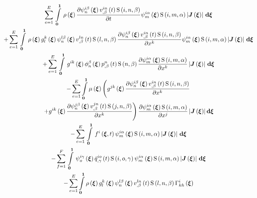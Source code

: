 \begin{multline}
  \gsum{e=1}{E}{\gint{\vectr{0}}{\vectr{1}}{\fnof{\rho}{\vectr{\xi}}\delby{\idxgbfn{i}{n}{\beta}{\vectr{\xi}}
  \fnof{\idxnodedof{v}{i}{n}{\beta}}{t}\idxgsf{i}{n}{\beta}}{t}\idxgbfn{i}{m}{\alpha}{\vectr{\xi}}\idxgsf{i}{m}{\alpha}\abs{\fnof{\matr{J}}{\vectr{\xi}}}}{\vectr{\xi}}}\\
  +\gsum{e=1}{E}{\gint{\vectr{0}}{\vectr{1}}{\fnof{\rho}{\vectr{\xi}}\fnof{g^{k}_{l}}{\vectr{\xi}}\idxgbfn{l}{n}{\beta}{\vectr{\xi}}
  \fnof{\idxnodedof{v}{l}{n}{\beta}}{t}\idxgsf{l}{n}{\beta}\delby{\idxgbfn{i}{n}{\beta}{\vectr{\xi}}
  \fnof{\idxnodedof{v}{i}{n}{\beta}}{t}\idxgsf{i}{n}{\beta}}{x^{k}}\idxgbfn{i}{m}{\alpha}{\vectr{\xi}}\idxgsf{i}{m}{\alpha}\abs{\fnof{\matr{J}}{\vectr{\xi}}}}{\vectr{\xi}}}\\
  +\gsum{e=1}{E}{\gint{\vectr{0}}{\vectr{1}}{\fnof{g^{ik}}{\vectr{\xi}}\altgbfn{n}{\beta}{\vectr{\xi}}
  \fnof{\nodedof{p}{n}{\beta}}{t}\gsf{n}{\beta}\delby{\idxgbfn{i}{m}{\alpha}{\vectr{\xi}}\idxgsf{i}{m}{\alpha}}{x^{k}}\abs{\fnof{\matr{J}}{\vectr{\xi}}}}{\vectr{\xi}}}\\
  -\dsuml{e=1}{E}\dintl{\vectr{0}}{\vectr{1}}\fnof{\mu}{\vectr{\xi}}\left(\fnof{g^{jk}}{\vectr{\xi}}\delby{\idxgbfn{i}{n}{\beta}{\vectr{\xi}}
      \fnof{\idxnodedof{v}{i}{n}{\beta}}{t}\idxgsf{i}{n}{\beta}}{x^{k}}\right.\\
    \left.+\fnof{g^{ik}}{\vectr{\xi}}\delby{\idxgbfn{j}{n}{\beta}{\vectr{\xi}}
  \fnof{\idxnodedof{v}{j}{n}{\beta}}{t}\idxgsf{j}{n}{\beta}}{x^{k}}\right)\delby{\idxgbfn{i}{m}{\alpha}{\vectr{\xi}}\idxgsf{i}{m}{\alpha}}{x^{j}}\abs{\fnof{\matr{J}}{\vectr{\xi}}}\exteriorderiv{\vectr{\xi}} \\
  -\gsum{e=1}{E}{\gint{\vectr{0}}{\vectr{1}}{\fnof{f^{i}}{\vectr{\xi},t}\idxgbfn{i}{m}{\alpha}{\vectr{\xi}}\idxgsf{i}{m}{\alpha}\abs{\fnof{\matr{J}}{\vectr{\xi}}}}{\vectr{\xi}}}\\
  -\gsum{f=1}{F}{\gint{\vectr{0}}{\vectr{1}}{\idxgbfn{i}{o}{\gamma}{\vectr{\xi}}
      \fnof{\idxnodedof{\bar{q}}{i}{o}{\gamma}}{t}\idxgsf{i}{o}{\gamma}\idxgbfn{i}{m}{\alpha}{\vectr{\xi}}\idxgsf{i}{m}{\alpha}\abs{\fnof{\matr{J}}{\vectr{\xi}}}}{\vectr{\xi}}}\\
  -\dsuml{e=1}{E} \dintl{\vectr{0}}{\vectr{1}} \fnof{\rho}{\vectr{\xi}}
  \fnof{g^{k}_{l}}{\vectr{\xi}}\idxgbfn{l}{n}{\beta}{\vectr{\xi}}
  \fnof{\idxnodedof{v}{l}{n}{\beta}}{t}\idxgsf{l}{n}{\beta}\fnof{\christoffel{i}{k}{h}}{\vectr{\xi}}

\end{multline}
